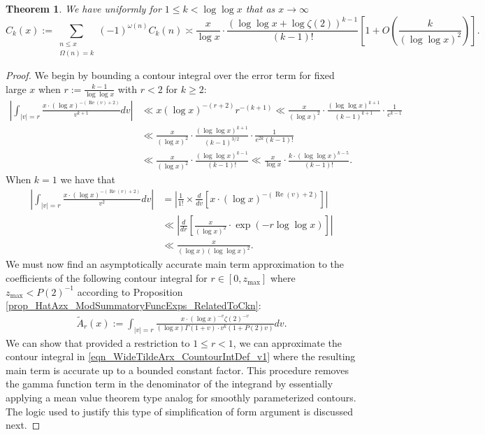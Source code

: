 \documentclass[11pt,reqno,a4letter]{article}
\numberwithin{figure}{section}
\numberwithin{table}{section}
\theoremstyle{plain}
\newtheorem{theorem}{Theorem}
\numberwithin{theorem}{section}
\theoremstyle{definition}
\renewcommand{\Re}{\operatorname{Re}}
\begin{document}
\begin{theorem} 
\label{theorem_CnkSpCasesScaledSummatoryFuncs} 
We have uniformly for $1 \leq k < \log\log x$ 
that as $x \rightarrow \infty$ 
\[
\widehat{C}_k(x) := 
     \sum_{\substack{n \leq x \\ \Omega(n) = k}} (-1)^{\omega(n)} 
     C_k(n) \asymp 
     \frac{x}{\log x} \cdot \frac{(\log\log x + \log\zeta(2))^{k-1}}{(k-1)!} \left[1 + 
     O\left(\frac{k}{(\log\log x)^2}\right)\right]. 
\]
\end{theorem} 
\begin{proof} 
We begin by bounding a contour integral over the error term for fixed large $x$ when 
$r := \frac{k-1}{\log\log x}$ with $r < 2$ for $k \geq 2$: 
\begin{align*} 
\left\lvert \int_{|v|=r} \frac{x \cdot (\log x)^{-(\Re(v) + 2)}}{v^{k+1}} dv \right\rvert & \ll 
     x (\log x)^{-(r+2)} r^{-(k+1)} \ll \frac{x}{(\log x)^2} \cdot 
     \frac{(\log\log x)^{k+1}}{(k-1)^{k+1}} \cdot \frac{1}{e^{k-1}} \\ 
     & \ll \frac{x}{(\log x)^2} \cdot \frac{(\log\log x)^{k+1}}{(k-1)^{3/2}} \cdot 
     \frac{1}{e^{2k} (k-1)!} \\ 
     & \ll \frac{x}{(\log x)^2} \cdot \frac{(\log\log x)^{k-1}}{(k-1)!} \ll 
     \frac{x}{\log x} \cdot \frac{k \cdot (\log\log x)^{k-5}}{(k-1)!}. 
\end{align*} 
When $k = 1$ we have that 
\begin{align*} 
\left\lvert \int_{|v|=r} \frac{x \cdot (\log x)^{-(\Re(v) + 2)}}{v^{2}} dv \right\rvert & = 
     \left\lvert \frac{1}{1!} \times \frac{d}{dv}\left[x \cdot (\log x)^{-(\Re(v) + 2)}\right] \right\rvert \\ 
     & \ll \left\lvert \frac{d}{dr}\left[\frac{x}{(\log x)^2} \cdot \exp(-r \log\log x)\right] \right\rvert \\ 
     & \ll \frac{x}{(\log x)(\log\log x)^2}. 
\end{align*} 
We must now find an asymptotically accurate main term approximation to the coefficients 
of the following contour integral for $r \in [0, z_{\max}]$ where $z_{\max} < P(2)^{-1}$ 
according to Proposition \ref{prop_HatAzx_ModSummatoryFuncExps_RelatedToCkn}: 
\begin{align} 
\label{eqn_WideTildeArx_CountourIntDef_v1} 
\widetilde{A}_r(x) := 
     \int_{|v|=r} \frac{x \cdot (\log x)^{-v} \zeta(2)^{-v}}{(\log x) \Gamma(1+v) \cdot 
     v^{k} (1 + P(2) v)} dv. 
\end{align} 
We can show that provided a restriction to 
$1 \leq r < 1$, we can approximate the contour integral in 
\eqref{eqn_WideTildeArx_CountourIntDef_v1} where 
the resulting main term is accurate up to a bounded constant factor. 
This procedure removes the 
gamma function term in the denominator of the integrand by essentially applying 
a mean value theorem type analog for smoothly 
parameterized contours. The logic used to justify this 
type of simplification of form argument is discussed next. 


\end{proof}
\end{document}

